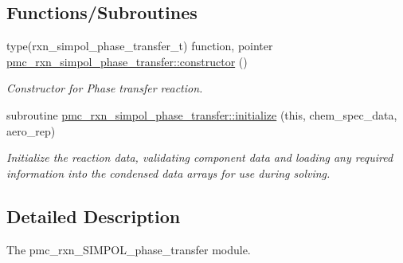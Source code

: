 \subsection*{Functions/\+Subroutines}
\begin{DoxyCompactItemize}
\item 
type(rxn\+\_\+simpol\+\_\+phase\+\_\+transfer\+\_\+t) function, pointer \mbox{\hyperlink{namespacepmc__rxn__simpol__phase__transfer_a5ef9b6f52ac7c70ea3b93d8b947b8f03}{pmc\+\_\+rxn\+\_\+simpol\+\_\+phase\+\_\+transfer\+::constructor}} ()
\begin{DoxyCompactList}\small\item\em Constructor for Phase transfer reaction. \end{DoxyCompactList}\item 
subroutine \mbox{\hyperlink{namespacepmc__rxn__simpol__phase__transfer_a717a70c576f34f6d3ae773bcc0a12ca0}{pmc\+\_\+rxn\+\_\+simpol\+\_\+phase\+\_\+transfer\+::initialize}} (this, chem\+\_\+spec\+\_\+data, aero\+\_\+rep)
\begin{DoxyCompactList}\small\item\em Initialize the reaction data, validating component data and loading any required information into the condensed data arrays for use during solving. \end{DoxyCompactList}\end{DoxyCompactItemize}


\subsection{Detailed Description}
The pmc\+\_\+rxn\+\_\+\+S\+I\+M\+P\+O\+L\+\_\+phase\+\_\+transfer module. 

